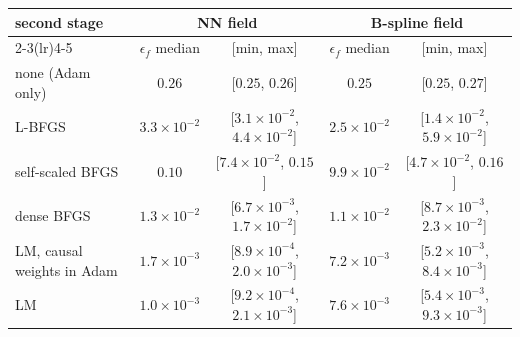 \begin{tabular}{lcccc}
\toprule
second stage & \multicolumn{2}{c}{NN field} & \multicolumn{2}{c}{B-spline field} \\
\cmidrule(lr){2-3}\cmidrule(lr){4-5}
 & $\epsilon_f$ median & [min, max] & $\epsilon_f$ median & [min, max] \\
\midrule
none (Adam only) & $0.26$ & [$0.25$, $0.26$] & $0.25$ & [$0.25$, $0.27$] \\
L-BFGS & $3.3\times10^{-2}$ & [$3.1\times10^{-2}$, $4.4\times10^{-2}$] & $2.5\times10^{-2}$ & [$1.4\times10^{-2}$, $5.9\times10^{-2}$] \\
self-scaled BFGS & $0.10$ & [$7.4\times10^{-2}$, $0.15$] & $9.9\times10^{-2}$ & [$4.7\times10^{-2}$, $0.16$] \\
dense BFGS & $1.3\times10^{-2}$ & [$6.7\times10^{-3}$, $1.7\times10^{-2}$] & $1.1\times10^{-2}$ & [$8.7\times10^{-3}$, $2.3\times10^{-2}$] \\
LM, causal weights in Adam & $1.7\times10^{-3}$ & [$8.9\times10^{-4}$, $2.0\times10^{-3}$] & $7.2\times10^{-3}$ & [$5.2\times10^{-3}$, $8.4\times10^{-3}$] \\
LM & $1.0\times10^{-3}$ & [$9.2\times10^{-4}$, $2.1\times10^{-3}$] & $7.6\times10^{-3}$ & [$5.4\times10^{-3}$, $9.3\times10^{-3}$] \\
\bottomrule
\end{tabular}
